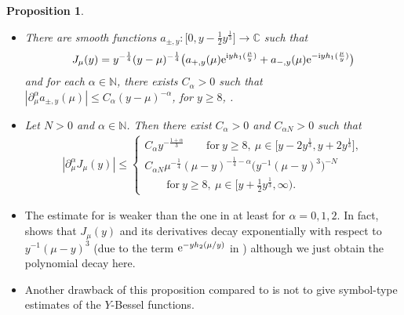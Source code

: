 \documentclass[10pt,a4paper]{amsart}
\numberwithin{equation}{section}
\newtheorem{Proposition}[Theorem]{Proposition}
 { \theoremstyle{definition}
\newtheorem{Definition}[Theorem]{Definition}
\newtheorem{Note}[Theorem]{Note}
\newtheorem{Example}[Theorem]{Example}
\newtheorem{Remark}[Theorem]{Remark} }
\def\a{\alpha}
\def\m{\mu}
\def\pa{\partial}
\begin{document}
\begin{Proposition}\label{Besselasymp}\quad
\begin{itemize}\itemsep=0pt
\item[$(i)$] There are smooth functions $a_{\pm,y}\colon \bigl[0,y-\frac{1}{2}y^{\frac{1}{3}}\bigr]\to \mathbb{C}$ such that
\begin{align*}
J_{\m}(y)=y^{-\frac{1}{4}}(y-\m)^{-\frac{1}{4}}\bigl(a_{+,y}(\m){\rm e}^{{\rm i}yh_1(\frac{\m}{y})}+a_{-,y}(\m){\rm e}^{-{\rm i}yh_1(\frac{\m}{y})} \bigr)
\end{align*}
and for each $\a\in\mathbb{N}$, there exists $C_{\a}>0$ such that
$
|\pa_{\m}^{\a}a_{\pm,y}(\m)|\leq C_{\a}(y-\m)^{-\a}$, for $ y\geq 8$, \smash{$ \m\in \bigl[0,y-\frac{1}{2}y^{\frac{1}{3}}\bigr]$}.
\item[$(ii)$] Let $N>0$ and $\a\in\mathbb{N}$. Then there exist $C_{\a}>0$ and $C_{\a N}>0$ such that
\begin{align*}
|\pa_{\m}^{\a}J_{\m}(y)|\leq \begin{cases}C_{\a}y^{-\frac{1+\a}{3}} \qquad \text{for}\  y\geq 8,\  \m\in \bigl[y-2y^{\frac{1}{3}},y+2y^{\frac{1}{3}}\bigr],\\
C_{\a N}\m^{-\frac{1}{4}}(\m-y)^{-\frac{1}{4}-\a} \bigl(y^{-1}(\m-y)^3 \bigr)^{-N} \\
\qquad \text{for}\  y\geq 8,\  \m\in \bigl[y+\frac{1}{2}y^{\frac{1}{3}},\infty\bigr).
\end{cases}
\end{align*}
\end{itemize}
\end{Proposition}

\begin{Remark}\quad
\begin{itemize}\itemsep=0pt
\item[(1)] The estimate for \smash{$\m\in \bigl[y+\frac{1}{2}y^{\frac{1}{3}},\infty\bigr)$} is weaker than the one in \cite[Theorem 9.1]{IJ} at least for $\a=0,1,2$. In fact, \cite[Theorem 9.1]{IJ} shows that $J_{\m}(y)$ and its derivatives decay exponentially with respect to $y^{-1}(\m-y)^3$ (due to the term ${\rm e}^{-yh_2(\m/y)}$ in \cite{IJ}) although we just obtain the polynomial decay here.

\item[(2)] Another drawback of this proposition compared to \cite[Theorem 9.1]{IJ} is not to give symbol-type estimates of the $Y$-Bessel functions.
\end{itemize}
\end{Remark}
\end{document}
